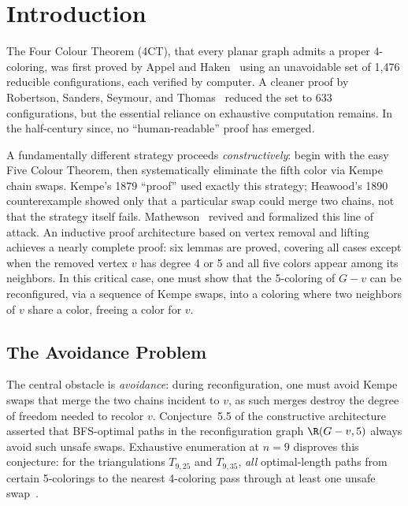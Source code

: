 
\section{Introduction}\label{sec:introduction}

The Four Colour Theorem (4CT), that every planar graph admits a proper
$4$-coloring, was first proved by Appel and Haken~\cite{appel1977}
using an unavoidable set of 1,476 reducible configurations, each
verified by computer. A cleaner proof by Robertson, Sanders, Seymour,
and Thomas~\cite{robertson1997} reduced the set to 633 configurations,
but the essential reliance on exhaustive computation remains. In the
half-century since, no ``human-readable'' proof has emerged.

A fundamentally different strategy proceeds \emph{constructively}: begin
with the easy Five Colour Theorem, then systematically eliminate the
fifth color via Kempe chain swaps. Kempe's 1879 ``proof'' used exactly
this strategy; Heawood's 1890 counterexample showed only that a
particular swap could merge two chains, not that the strategy itself
fails. Mathewson~\cite{mathewson2025constructive} revived and formalized this line of
attack. An inductive proof architecture based on vertex removal and
lifting achieves a nearly complete proof: six lemmas are proved,
covering all cases except when the removed vertex $v$ has degree 4 or 5
and all five colors appear among its neighbors. In this critical case,
one must show that the 5-coloring of $G - v$ can be reconfigured,
via a sequence of Kempe swaps, into a coloring where two neighbors of
$v$ share a color, freeing a color for $v$.

\subsection{The Avoidance Problem}

The central obstacle is \emph{avoidance}: during reconfiguration, one
must avoid Kempe swaps that merge the two chains incident to $v$, as
such merges destroy the degree of freedom needed to recolor $v$.
Conjecture~5.5 of the constructive architecture asserted that
BFS-optimal paths in the reconfiguration graph $\R(G - v, 5)$ always
avoid such unsafe swaps. Exhaustive enumeration at $n = 9$ disproves this
conjecture: for the triangulations $T_{9,25}$ and $T_{9,35}$, \emph{all}
optimal-length paths from certain 5-colorings to the nearest 4-coloring
pass through at least one unsafe swap~\cite{mathewson2025}.


